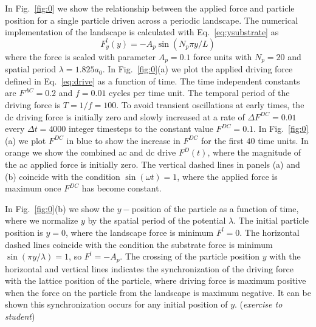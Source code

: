 \documentclass[twocolumn,preprintnumbers,amsmath,amssymb,aps,prx]{revtex4}
\begin{document}
In Fig.~\ref{fig:0} we
show the relationship between the applied force and particle
position %
for 
a single particle driven across a periodic landscape. 
%
The numerical implementation of the landscape 
is calculated with Eq.~\ref{eq:ysubstrate} as 
\begin{equation}
  \label{eq:force}
  F^l_y(y) = -A_{p} \sin{(N_p \pi y / L)} 
\end{equation}
where the force is scaled with parameter $A_{p} = 0.1$ force units 
with $N_p=20$ %
and spatial period $\lambda = 1.825 a_0$.
%
In Fig.~\ref{fig:0}(a)
we plot the applied driving force defined in Eq.~\ref{eq:drive}
as a function of time.
The time independent constants are 
$F^{AC}=0.2$ and $f=0.01$ cycles per time unit.
The temporal period of the driving force is
$T = 1/f = 100$.
To avoid transient oscillations at early times, 
the dc driving force is initially zero   
and 
slowly increased %
at a rate of $\Delta F^{DC} = 0.01$ every $\Delta t = 4000$ integer timesteps 
to the constant value $F^{DC}=0.1$.
In Fig.~\ref{fig:0}(a) we plot $F^{DC}$
in blue to show the increase in 
$F^{DC}$ for the first $40$ time units.
In orange we show 
the combined ac and dc drive $F^D(t)$,
where 
the magnitude of the ac applied force is initially zero.
The vertical dashed lines in panels (a) and (b) coincide
with the condition $\sin{(\omega t)} = 1$,
where the applied force is maximum once $F^{DC}$ has become constant.



In Fig.~\ref{fig:0}(b) 
we show the $y-$position of the particle
as a function of time,
where we 
normalize $y$ by the spatial period of the potential %
$\lambda$.
The initial particle position is $y=0$,
where the landscape force is minimum $F^l = 0$.
The horizontal dashed lines
coincide with the condition the substrate force is
minimum 
$\sin{(\pi y / \lambda)} = 1 $, so $F^l = -A_p$.
The crossing of the particle position $y$
with the horizontal and vertical lines
indicates the synchronization
of the driving force with the lattice position of the particle,
where driving force is maximum positive when the
force on the particle from the landscape is maximum negative.
It can be shown this synchronization
occurs for any initial position of $y$.
({\it exercise to student})
\end{document}
